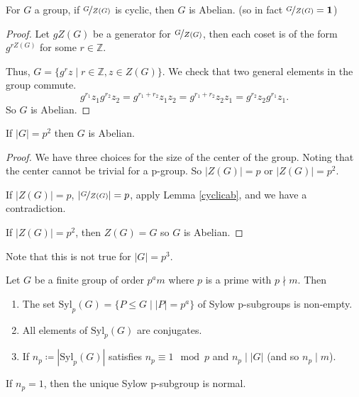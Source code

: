 \begin{lemma}
    For \(G\) a group, if \(\nicefrac{G}{Z(G)}\) is cyclic, then \(G\) is Abelian. (so in fact \(\nicefrac{G}{Z(G)} = \textbf{1} \))
    \label{cyclicab}
\end{lemma}
\begin{proof}
    Let \(gZ(G)\) be a generator for \(\nicefrac{G}{Z(G)}\), then each coset is of the form \(g^{rZ(G)}\) for some \(r \in \mathbb{Z}\).

    Thus, \(G = \{g^{r}z\mid r\in \mathbb{Z}, z\in Z(G)\}\). We check that two general elements in the group commute.
    \[
        g^{r_1}z_1 g^{r_2}z_2 = g^{r_1 + r_2}z_{1}z_2= g^{r_1 + r_2}z_{2}z_1=g^{r_2}z_2 g^{r_1}z_1.
    \]
    So \(G\) is Abelian.
\end{proof}
\begin{corollary}
    If \(\left\vert G \right\vert =p^2\) then \(G\) is Abelian.
\end{corollary}
\begin{proof}
    We have three choices for the size of the center of the group. Noting that the center cannot be trivial for a p-group. So \(\left\vert Z(G) \right\vert = p\) or \(\left\vert Z(G) \right\vert = p^2\).

    If \(\left\vert Z(G) \right\vert = p\), \(\left\vert \nicefrac{G}{Z(G)} \right\vert = p\), apply Lemma \eqref{cyclicab}, and we have a contradiction.

    If \(\left\vert Z(G) \right\vert = p^2\), then \(Z(G) = G\) so \(G\) is Abelian.
\end{proof}
Note that this is not true for \(\left\vert G \right\vert = p^3\).
\begin{theorem}
    Let \(G\) be a finite group of order \(p^a m\) where \(p\) is a prime with \(p \nmid m\). Then
    \begin{enumerate}
        \item The set \(\mathrm{Syl}_p(G) = \{P \leq G\mid \left\vert P \right\vert = p^a\}\) of Sylow p-subgroups is non-empty.
        \item All elements of \(\mathrm{Syl}_p(G)\) are conjugates.
        \item If \(n_p\coloneqq \left\vert \mathrm{Syl}_p(G) \right\vert \) satisfies \(n_p \equiv 1 \mod p\) and \(n_p \mid \left\vert G \right\vert \) (and so \(n_p\mid m\)).
    \end{enumerate}
\end{theorem}
\begin{corollary}
    If \(n_p = 1\), then the unique Sylow p-subgroup is normal.
\end{corollary}
